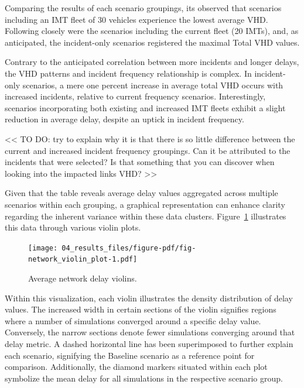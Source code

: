 \documentclass[fancy, oneside, mastersfancy, ms]{byuthesis}
\begin{document}
Comparing the results of each scenario groupings, its observed that
scenarios including an IMT fleet of 30 vehicles experience the lowest
average VHD. Following closely were the scenarios including the current
fleet (20 IMTs), and, as anticipated, the incident-only scenarios
registered the maximal Total VHD values.

Contrary to the anticipated correlation between more incidents and
longer delays, the VHD patterns and incident frequency relationship is
complex. In incident-only scenarios, a mere one percent increase in
average total VHD occurs with increased incidents, relative to current
frequency scenarios. Interestingly, scenarios incorporating both
existing and increased IMT fleets exhibit a slight reduction in average
delay, despite an uptick in incident frequency.

\textless\textless{} TO DO: try to explain why it is that there is so
little difference between the current and increased incident frequency
groupings. Can it be attributed to the incidents that were selected? Is
that something that you can discover when looking into the impacted
links VHD? \textgreater\textgreater{}

Given that the table reveals average delay values aggregated across
multiple scenarios within each grouping, a graphical representation can
enhance clarity regarding the inherent variance within these data
clusters. Figure~\ref{fig-network_violin_plot} illustrates this data
through various violin plots.

\begin{figure}

{\centering \texttt{[image: 04\_results\_files/figure-pdf/fig-network\_violin\_plot-1.pdf]}

}

\caption{\label{fig-network_violin_plot}Average network delay violins.}

\end{figure}

Within this visualization, each violin illustrates the density
distribution of delay values. The increased width in certain sections of
the violin signifies regions where a number of simulations converged
around a specific delay value. Conversely, the narrow sections denote
fewer simulations converging around that delay metric. A dashed
horizontal line has been superimposed to further explain each scenario,
signifying the Baseline scenario as a reference point for comparison.
Additionally, the diamond markers situated within each plot symbolize
the mean delay for all simulations in the respective scenario group.
\end{document}
